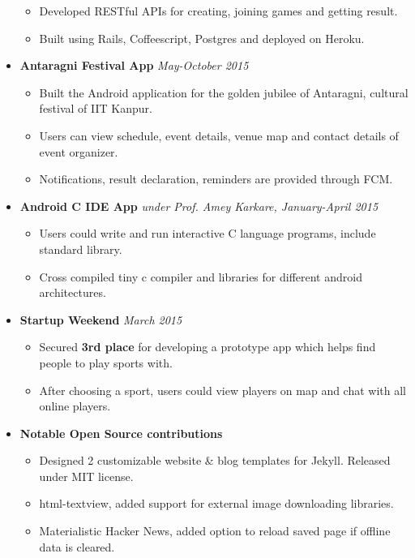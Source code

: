 \documentclass[a4paper]{article}
\begin{document}
\begin{itemize}
\begin{itemize}
		\item Developed RESTful APIs for creating, joining games and getting result.
		\item Built using Rails, Coffeescript, Postgres and deployed on Heroku.
	      \end{itemize}
	\item
	      \textbf{Antaragni Festival App}
	      \hfill \textit{May-October 2015}
	      \begin{itemize}
	      	\vspace{-2mm} \setlength\itemsep{-0.2em}
	      	\item Built the Android application for the golden jubilee of Antaragni, cultural festival of IIT Kanpur.
	      	\item Users can view schedule, event details, venue map and contact details of event organizer.
	      	\item Notifications, result declaration, reminders are provided through FCM.
	      \end{itemize}
	\item
	      \textbf{Android C IDE App}
	      \hfill \textit{under Prof. Amey Karkare, January-April 2015}
	      \begin{itemize}
	      	\vspace{-2mm} \setlength\itemsep{-0.2em}
	      	\item Users could write and run interactive C language programs, include standard library.
	      	\item Cross compiled tiny c compiler and libraries for different android architectures.
	      \end{itemize}
		\item
	      \textbf{Startup Weekend}
	      \hfill \textit{March 2015}
	      \begin{itemize}
	      	\vspace{-2mm} \setlength\itemsep{-0.2em}
	      	\item Secured \textbf{3rd place} for developing a prototype app which helps find people to play sports with.
	      	\item After choosing a sport, users could view players on map and chat with all online players.
	      \end{itemize}
	\item
	      \textbf{Notable Open Source contributions}
	      \begin{itemize}
	      	\vspace{-2mm} \setlength\itemsep{-0.2em}
	      	\item Designed 2 customizable website \& blog templates for Jekyll. Released under MIT license.
	      	\item html-textview, added support for external image downloading libraries.
	      	\item Materialistic Hacker News, added option to reload saved page if offline data is cleared.
	      \end{itemize}
\end{itemize}
\end{document}
